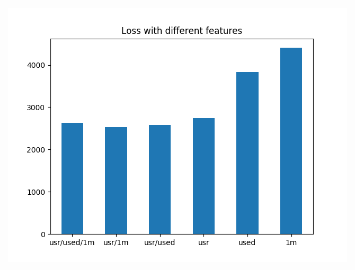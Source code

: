 \documentclass[aspectratio=169,11pt,hyperref={colorlinks=true}]{beamer}
\begin{document}
\begin{frame}
\begin{columns}
\begin{center}
        \begin{figure}
          \includegraphics[width=0.8\textwidth,height=0.4\textheight]{graphs/loss_by_feature-node_provider_all.png}
        \end{figure}
      \end{center}
  \end{columns}
\end{frame}
\end{document}
